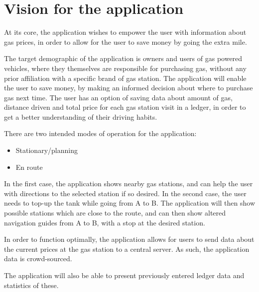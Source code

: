 
\chapter{Vision for the application}
At its core, the application wishes to empower the user with information about gas prices, in order to allow for the user to save money by going the extra mile.

The target demographic of the application is owners and users of gas powered vehicles, where they themselves are responsible for purchasing gas, without any prior affiliation with a specific brand of gas station. The application will enable the user to save money, by making an informed decision about where to purchase gas next time. The user has an option of saving data about amount of gas, distance driven and total price for each gas station visit in a ledger, in order to get a better understanding of their driving habits.

There are two intended modes of operation for the application:
\begin{itemize}
	\item Stationary/planning
	\item En route
\end{itemize}
In the first case, the application shows nearby gas stations, and can help the user with directions to the selected station if so desired. In the second case, the user needs to top-up the tank while going from A to B. The application will then show possible stations which are close to the route, and can then show altered navigation guides from A to B, with a stop at the desired station.

In order to function optimally, the application allows for users to send data about the current prices at the gas station to a central server. As such, the application data is crowd-sourced.

The application will also be able to present previously entered ledger data and statistics of these.
